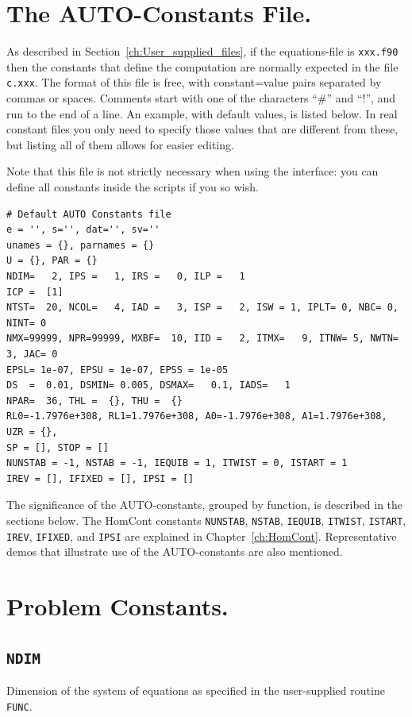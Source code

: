 \documentclass[12pt]{report}
\begin{document}
\section{ The {\cal AUTO}-Constants File.} \label{sec:The_AUTO_constants_file}
As described in Section~\ref{ch:User_supplied_files}, 
if the equations-file is {\tt xxx.f90} 
then the constants that define the computation 
are normally expected in the file  {\tt c.xxx}.
The format of this file is free, with constant=value pairs separated
by commas or spaces. Comments start with one of the characters  ``\#''
and ``!'', and run to the end of a line.
An example, with default values, is listed below. In real constant
files you only need to specify those values that are different from
these, but listing all of them allows for easier editing.

Note that this file is not strictly necessary when using the \python
interface: you can define all constants inside the scripts if you so wish.

\begin{verbatim}
# Default AUTO Constants file
e = '', s='', dat='', sv=''
unames = {}, parnames = {}
U = {}, PAR = {}
NDIM=   2, IPS =   1, IRS =   0, ILP =   1
ICP =  [1]
NTST=  20, NCOL=   4, IAD =   3, ISP =   2, ISW = 1, IPLT= 0, NBC= 0, NINT= 0
NMX=99999, NPR=99999, MXBF=  10, IID =   2, ITMX=   9, ITNW= 5, NWTN= 3, JAC= 0
EPSL= 1e-07, EPSU = 1e-07, EPSS = 1e-05
DS  =  0.01, DSMIN= 0.005, DSMAX=   0.1, IADS=   1
NPAR=  36, THL =  {}, THU =  {}
RL0=-1.7976e+308, RL1=1.7976e+308, A0=-1.7976e+308, A1=1.7976e+308,
UZR = {},
SP = [], STOP = []
NUNSTAB = -1, NSTAB = -1, IEQUIB = 1, ITWIST = 0, ISTART = 1
IREV = [], IFIXED = [], IPSI = []
\end{verbatim}

The significance of the {\cal AUTO}-constants, grouped by function, is 
described in the sections below. The HomCont constants \texttt{NUNSTAB},
\texttt{NSTAB}, \texttt{IEQUIB}, \texttt{ITWIST}, \texttt{ISTART},
\texttt{IREV}, \texttt{IFIXED}, and \texttt{IPSI} are explained in
Chapter~\ref{ch:HomCont}.
Representative demos that illustrate use of the {\cal AUTO}-constants
are also mentioned.

\section{ Problem Constants.} \label{sec:Problem_constants}
\subsection{\tt NDIM} \label{sec:NDIM}
 Dimension of the system of equations as specified in the user-supplied
 routine {\tt FUNC}.
\end{document}
